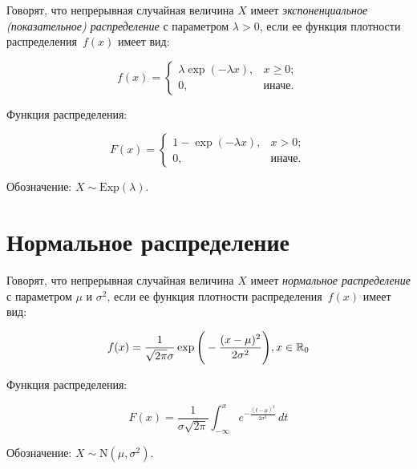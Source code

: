 Говорят, что  непрерывная случайная величина $X$ имеет \textit{экспоненциальное (показательное) распределение} с параметром $\lambda > 0$, если ее функция плотности распределения~$f(x)$ имеет вид:

\begin{equation}
	f(x) =
	\begin{cases}
		\lambda \exp(-\lambda x), & x \ge 0;\\
		0,  & \text{иначе}.
	\end{cases}
\end{equation}

Функция распределения: 

\begin{equation}
	F(x) = 
	\begin{cases}
		1 - \exp(-\lambda x), & x > 0;\\
		0,  & \text{иначе}.
	\end{cases}
\end{equation}

Обозначение: $X \sim \mathrm{Exp}(\lambda)$.

\chapter{Нормальное распределение}

Говорят, что  непрерывная случайная величина $X$ имеет \textit{нормальное распределение} с параметром $\mu$ и $\sigma^2$, если ее функция плотности распределения~$f(x)$ имеет вид:

\begin{equation}
	f(x) = \frac{1}{\sqrt{2\pi} \sigma} \exp\Bigg( -\frac{(x - \mu)^2}{2\sigma^2} \Bigg), \space x \in \mathbb{R}_0
\end{equation}

Функция распределения: 

\begin{equation}
	F(x) = \frac{1}{\sigma \sqrt{2\pi}} \int_{-\infty}^{x} e^{ -\frac{(t - \mu)^2}{2\sigma^2} } \, dt
\end{equation}

Обозначение: $X \sim \mathrm{N}(\mu, \sigma^2)$.